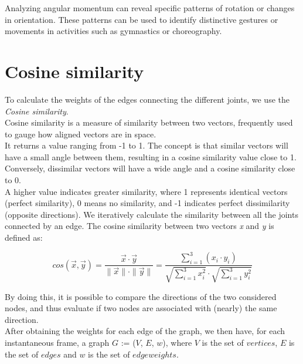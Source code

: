 Analyzing angular momentum can reveal specific patterns of rotation or changes in orientation.
These patterns can be used to identify distinctive gestures or movements in activities such as gymnastics or choreography.

\section{Cosine similarity} 
    
To calculate the weights of the edges connecting the different joints, we use the \textit{Cosine similarity}. \\ 
Cosine similarity is a measure of similarity between two vectors, frequently used to gauge how aligned vectors are in space. \\ 
It returns a value ranging from -1 to 1. 
The concept is that similar vectors will have a small angle between them, resulting in a cosine similarity value close to 1. \\ 
Conversely, dissimilar vectors will have a wide angle and a cosine similarity close to 0.\\ 
A higher value indicates greater similarity, where 1 represents identical vectors (perfect similarity), 0 means no similarity, and -1 indicates perfect dissimilarity (opposite directions). 
We iteratively calculate the similarity between all the joints connected by an edge. 
The cosine similarity between two vectors \textit{x} and \textit{y} is defined as: 

\begin{equation}  
  cos(\vec{x}, \vec{y}) = \frac{\vec{x} \cdot \vec{y}}{\|\vec{x}\| \cdot \|\vec{y}\|}  =  \frac{\sum_{i=1}^{3} (x_i \cdot y_i)}{\sqrt{\sum_{i=1}^{3} x_i^2} \cdot \sqrt{\sum_{i=1}^{3} y_i^2}}    
\end{equation} 

By doing this, it is possible to compare the directions of the two considered nodes, and thus evaluate if two nodes are associated with (nearly) the same direction. \\ 
After obtaining the weights for each edge of the graph, we then have, for each instantaneous frame, a graph $G$ := ($V$, $E$, $w$), where   
$V$ is the set of $vertices$, $E$ is the set of $edges$ and $w$ is the set of $edge weights$.

